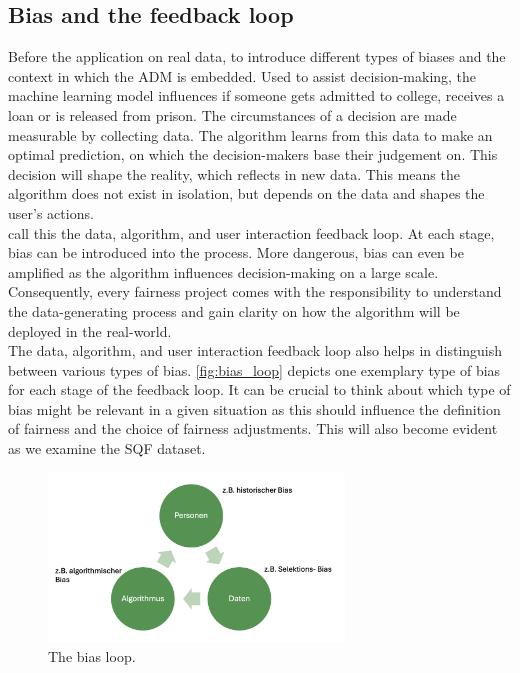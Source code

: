 \subsection{Bias and the feedback loop}
Before the application on real data, to introduce different types of biases and the context in which the ADM is embedded.
Used to assist decision-making, the machine learning model influences if someone gets admitted to college, receives a loan or is released from prison.
The circumstances of a decision are made measurable by collecting data. The algorithm learns from this data to make an optimal prediction, on which the decision-makers base their judgement on. This decision will shape the reality, which reflects in new data. This means the algorithm does not exist in isolation, but depends on the data and shapes the user's actions.\\ 
\cite{mehrabi2022} call this the data, algorithm, and user interaction feedback loop. At each stage, bias can be introduced into the process. More dangerous, bias can even be amplified as the algorithm influences decision-making on a large scale.
Consequently, every fairness project comes with the responsibility to understand the data-generating process and gain clarity on how the algorithm will be deployed in the real-world.\\
The data, algorithm, and user interaction feedback loop also helps in distinguish between various types of bias. \autoref{fig:bias_loop} depicts one exemplary type of bias for each stage of the feedback loop. It can be crucial to think about which type of bias might be relevant in a given situation as this should influence the definition of fairness and the choice of fairness adjustments. This will also become evident as we examine the SQF dataset.

\begin{figure}
    \centering
    \includegraphics[width=0.7\textwidth]{../figures/bias_loop.png}
    \caption{The bias loop.}
    \label{fig:bias_loop}
\end{figure}

